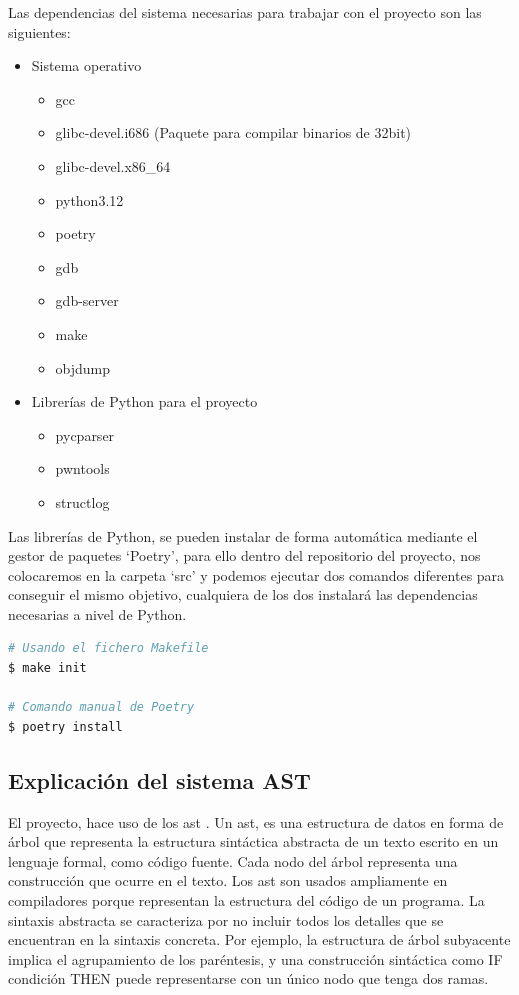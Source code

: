 Las dependencias del sistema necesarias para trabajar con el proyecto son las siguientes:
\begin{itemize}
    \item Sistema operativo
    \begin{itemize}
        \item \acrshort{gcc}
        \item glibc-devel.i686 (Paquete para compilar binarios de 32bit)
        \item glibc-devel.x86\_64
        \item python3.12
        \item poetry \cite{poetry-install}
        \item gdb
        \item gdb-server
        \item make
        \item objdump
    \end{itemize}
    \item Librerías de Python para el proyecto
    \begin{itemize}
        \item pycparser \cite{pycparser}
        \item pwntools \cite{pwntools}
        \item structlog \cite{structlog}
    \end{itemize}
\end{itemize}

Las librerías de Python, se pueden instalar de forma automática mediante el gestor de paquetes `Poetry', para ello dentro del repositorio del proyecto, nos colocaremos en la carpeta `src' y podemos ejecutar dos comandos diferentes para conseguir el mismo objetivo, cualquiera de los dos instalará las dependencias necesarias a nivel de Python.

\begin{lstlisting}[language=bash, caption=Instalacion de dependencias Python]
# Usando el fichero Makefile
$ make init

# Comando manual de Poetry
$ poetry install
\end{lstlisting}

\subsection{Explicación del sistema AST}
El proyecto, hace uso de los \acrfull{ast} \cite{ast}. Un \acrshort{ast}, es una estructura de datos en forma de árbol que representa la estructura sintáctica abstracta de un texto escrito en un lenguaje formal, como código fuente. Cada nodo del árbol representa una construcción que ocurre en el texto. Los \acrshort{ast} son usados ampliamente en compiladores porque representan la estructura del código de un programa. La sintaxis abstracta se caracteriza por no incluir todos los detalles que se encuentran en la sintaxis concreta. Por ejemplo, la estructura de árbol subyacente implica el agrupamiento de los paréntesis, y una construcción sintáctica como IF condición THEN puede representarse con un único nodo que tenga dos ramas.

